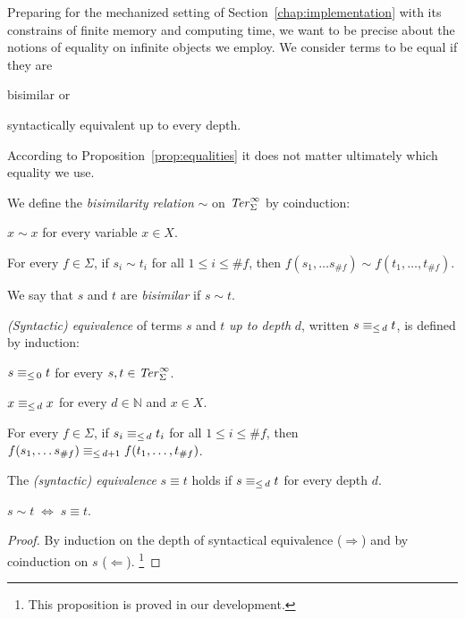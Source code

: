 Preparing for the mechanized setting of Section~\ref{chap:implementation} with
its constrains of finite memory and computing time, we want to be precise
about the notions of equality on infinite objects we employ. We consider terms
to be equal if they are
\begin{inparaenum}[(i)]
  \item bisimilar or
  \item syntactically equivalent up to every depth.
\end{inparaenum} According to Proposition~\ref{prop:equalities} it does not
matter ultimately which equality we use.

\begin{definition}\label{def:bisimilarity}%
We define the \emph{bisimilarity relation} $\sim$ on $\mathit{Ter}_\Sigma^\infty$ by
coinduction:
\begin{compactenum}
  \item
    $x \sim x$ for every variable $x \in X$.
  \item
    For every $f \in \Sigma$, if $s_i \sim t_i$ for all $1 \leq i \leq \#f$,
    then $f(s_1, \ldots s_{\#f}) \sim f(t_1, \ldots, t_{\#f})$.
\end{compactenum}
We say that $s$ and $t$ are \emph{bisimilar} if $s \sim t$.
\end{definition}

\begin{definition}\label{def:equiv}%
\emph{(Syntactic) equivalence} of terms $s$ and $t$ \emph{up to depth} $d$,
written $s \equiv_{\le \, d} t$, is defined by induction:
\begin{compactenum}
  \item $s \equiv_{\le \, 0} t$ for every $s, t \in \mathit{Ter}_\Sigma^\infty$.
  \item $x \equiv_{\le \, d} x$ for every $d \in \mathbb{N}$ and $x \in X$.
  \item For every $f \in \Sigma$, if $s_i \equiv_{\le \, d} t_i$ for all $1 \leq i
    \leq \#f$, then $f(s_1, \ldots s_{\#f}) \equiv_{\le \, d+1} f(t_1, \ldots,
    t_{\#f})$.
\end{compactenum}
The \emph{(syntactic) equivalence} $s \equiv t$ holds if $s \equiv_{\le \, d} t$ for
every depth $d$.
\end{definition}

\begin{proposition}\label{prop:equalities}
$s \sim t \; \Leftrightarrow \; s \equiv t$.
\end{proposition}
\begin{proof}
By induction on the depth of syntactical equivalence ($\Rightarrow$) and by
coinduction on $s$ ($\Leftarrow$).
\footnote{This proposition is proved in our \Coq development.}
\end{proof}

